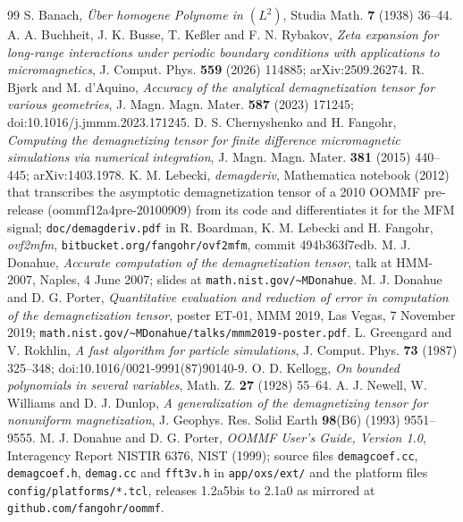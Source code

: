 \documentclass[11pt]{amsart}
\theoremstyle{plain}
\theoremstyle{definition}
\theoremstyle{remark}
\begin{document}
\begin{thebibliography}{99}
 S. Banach, \emph{\"Uber homogene Polynome in $(L^2)$},
Studia Math. \textbf{7} (1938) 36--44.
 A. A. Buchheit, J. K. Busse, T. Ke\ss ler and F. N. Rybakov,
\emph{Zeta expansion for long-range interactions under periodic boundary
conditions with applications to micromagnetics}, J. Comput. Phys. \textbf{559}
(2026) 114885; arXiv:2509.26274.
 R. Bj\o rk and M. d'Aquino, \emph{Accuracy of the analytical
demagnetization tensor for various geometries}, J. Magn. Magn. Mater.
\textbf{587} (2023) 171245; doi:10.1016/j.jmmm.2023.171245.
 D. S. Chernyshenko and H. Fangohr, \emph{Computing the
demagnetizing tensor for finite difference micromagnetic simulations via
numerical integration}, J. Magn. Magn. Mater. \textbf{381} (2015) 440--445;
arXiv:1403.1978.
 K. M. Lebecki, \emph{demagderiv}, Mathematica notebook
(2012) that transcribes the asymptotic demagnetization tensor of a 2010 OOMMF
pre-release (oommf12a4pre-20100909) from its code and differentiates it for the
MFM signal; \texttt{doc/demagderiv.pdf} in R. Boardman, K. M. Lebecki and
H. Fangohr, \emph{ovf2mfm}, \texttt{bitbucket.org/fangohr/ovf2mfm}, commit
494b363f7edb.
 M. J. Donahue, \emph{Accurate computation of the
demagnetization tensor}, talk at HMM-2007, Naples, 4 June 2007; slides at
\texttt{math.nist.gov/\~{}MDonahue}.
 M. J. Donahue and D. G. Porter, \emph{Quantitative evaluation
and reduction of error in computation of the demagnetization tensor}, poster
ET-01, MMM 2019, Las Vegas, 7 November 2019;
\texttt{math.nist.gov/\~{}MDonahue/talks/mmm2019-poster.pdf}.
 L. Greengard and V. Rokhlin, \emph{A fast algorithm for particle
simulations}, J. Comput. Phys. \textbf{73} (1987) 325--348;
doi:10.1016/0021-9991(87)90140-9.
 O. D. Kellogg, \emph{On bounded polynomials in several
variables}, Math. Z. \textbf{27} (1928) 55--64.
 A. J. Newell, W. Williams and D. J. Dunlop, \emph{A
generalization of the demagnetizing tensor for nonuniform magnetization}, J.
Geophys. Res. Solid Earth \textbf{98}(B6) (1993) 9551--9555.
 M. J. Donahue and D. G. Porter, \emph{OOMMF User's Guide,
Version 1.0}, Interagency Report NISTIR 6376, NIST (1999); source files
\texttt{demagcoef.cc}, \texttt{demagcoef.h}, \texttt{demag.cc} and
\texttt{fft3v.h} in \texttt{app/oxs/ext/} and the platform files
\texttt{config/platforms/*.tcl}, releases 1.2a5bis to 2.1a0 as mirrored at
\texttt{github.com/fangohr/oommf}.
\end{thebibliography}
\end{document}

